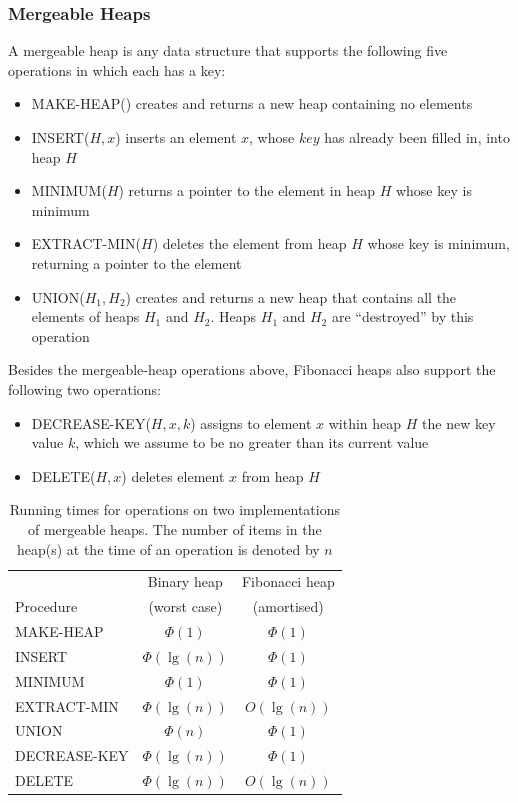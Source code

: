 \documentclass[12pt]{article}
\begin{document}
\subsubsection{Mergeable Heaps}
A mergeable heap is any data structure that supports the following five operations in which each has a key:

\begin{footnotesize}
\begin{itemize}
	\item MAKE-HEAP() creates and returns a new heap containing no elements
	\item INSERT($H, x$) inserts an element $x$, whose $key$ has already been filled in, into heap $H$
	\item MINIMUM($H$) returns a pointer to the element in heap $H$ whose key is minimum
	\item EXTRACT-MIN($H$) deletes the element from heap $H$ whose key is minimum, returning a pointer to the element
	\item UNION($H_1, H_2$) creates and returns a new heap that contains all the elements of heaps $H_1$ and $H_2$. Heaps $H_1$ and $H_2$ are ``destroyed'' by this operation
\end{itemize}
\end{footnotesize}

Besides the mergeable-heap operations above, Fibonacci heaps also support the following two operations:

\begin{footnotesize}
\begin{itemize}
	\item DECREASE-KEY($H, x, k$) assigns to element $x$ within heap $H$ the new key value $k$, which we assume to be no greater than its current value
	\item DELETE($H, x$) deletes element $x$ from heap $H$
\end{itemize}
\end{footnotesize}

\begin{footnotesize}
\begin{table}[H]
\center
\begin{tabular}{l c c}
 & Binary heap & Fibonacci heap \\
 Procedure & (worst case) & (amortised)\\
\hline
MAKE-HEAP 		& $\Phi(1)$ 		& $\Phi(1)$\\
INSERT 			& $\Phi(\lg(n))$ 	& $\Phi(1)$\\
MINIMUM			& $\Phi(1)$		& $\Phi(1)$\\
EXTRACT-MIN		& $\Phi(\lg(n))$	& $O(\lg(n))$\\
UNION			& $\Phi(n)$		& $\Phi(1)$\\
DECREASE-KEY	& $\Phi(\lg(n))$	& $\Phi(1)$\\
DELETE			& $\Phi(\lg(n))$	& $O(\lg(n))$
\end{tabular}
\caption{Running times for operations on two implementations of mergeable heaps. The number of items in the heap(s) at the time of an operation is denoted by $n$}
\end{table}
\end{footnotesize}
%
\end{document}
